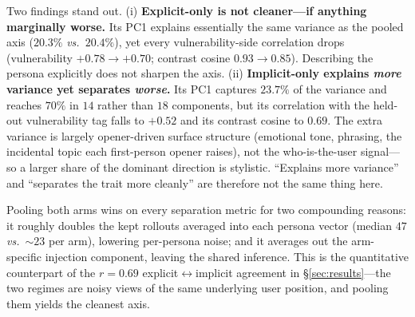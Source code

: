 \documentclass{article}
\newcommand{\vs}{\emph{vs.}\ }
\begin{document}
Two findings stand out. (i) \textbf{Explicit-only is not cleaner---if anything
marginally worse.} Its PC1 explains essentially the same variance as the pooled
axis ($20.3\%$ \vs $20.4\%$), yet every vulnerability-side correlation drops
(vulnerability $+0.78 \to +0.70$; contrast cosine $0.93 \to 0.85$). Describing the
persona explicitly does not sharpen the axis. (ii) \textbf{Implicit-only explains
\emph{more} variance yet separates \emph{worse}.} Its PC1 captures $23.7\%$ of the
variance and reaches $70\%$ in $14$ rather than $18$ components, but its
correlation with the held-out vulnerability tag falls to $+0.52$ and its contrast
cosine to $0.69$. The extra variance is largely opener-driven surface structure
(emotional tone, phrasing, the incidental topic each first-person opener raises),
not the who-is-the-user signal---so a larger share of the dominant direction is
stylistic. ``Explains more variance'' and ``separates the trait more cleanly'' are
therefore not the same thing here.

Pooling both arms wins on every separation metric for two compounding reasons: it
roughly doubles the kept rollouts averaged into each persona vector (median $47$
\vs $\sim\!23$ per arm), lowering per-persona noise; and it averages out the
arm-specific injection component, leaving the shared inference. This is the
quantitative counterpart of the $r{=}0.69$ explicit$\leftrightarrow$implicit
agreement in \S\ref{sec:results}---the two regimes are noisy views of the same
underlying user position, and pooling them yields the cleanest axis.
\end{document}
